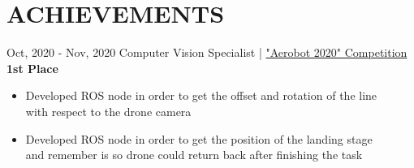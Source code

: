\documentclass[]{friggeri-cv_reccius-experiment}
\begin{document}
\section{ACHIEVEMENTS}
\begin{entrylist}

  \entry
    {Oct, 2020 - Nov, 2020\enspace}
    {Computer Vision Specialist | }{ \href{https://aerobot2020.ru/}{\small "Aerobot 2020" Competition \faMousePointer}}
    {\normalsize\textbf{\color{ipsgreen}\space 1st Place}}
    {\jobspace
    \begin{itemize}[leftmargin=*, itemsep = 0.1em]
    \item Developed ROS node in order to get the offset and rotation of the line\\ with respect to the drone camera
    \item Developed ROS node in order to get the position of the landing stage \\ and remember is so drone could return back after finishing the task\\
    \end{itemize}
    }
    
    
\end{entrylist}


\end{document}
